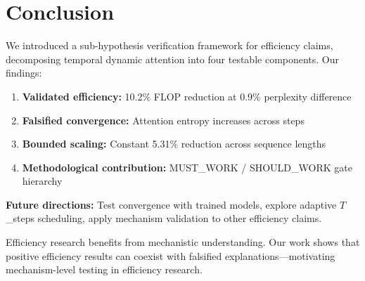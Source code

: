 \section{Conclusion}
\label{sec:conclusion}

We introduced a sub-hypothesis verification framework for efficiency claims, decomposing temporal dynamic attention into four testable components. Our findings:

\begin{enumerate}
    \item \textbf{Validated efficiency:} 10.2\% FLOP reduction at 0.9\% perplexity difference
    \item \textbf{Falsified convergence:} Attention entropy increases across steps
    \item \textbf{Bounded scaling:} Constant 5.31\% reduction across sequence lengths
    \item \textbf{Methodological contribution:} MUST\_WORK / SHOULD\_WORK gate hierarchy
\end{enumerate}

\textbf{Future directions:} Test convergence with trained models, explore adaptive $T$\_steps scheduling, apply mechanism validation to other efficiency claims.

Efficiency research benefits from mechanistic understanding. Our work shows that positive efficiency results can coexist with falsified explanations---motivating mechanism-level testing in efficiency research.
